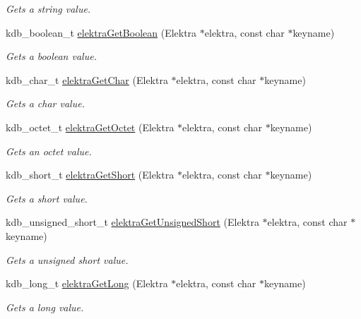 \begin{DoxyCompactItemize}
\begin{DoxyCompactList}\small\item\em Gets a string value. \end{DoxyCompactList}\item 
kdb\+\_\+boolean\+\_\+t \mbox{\hyperlink{group__highlevel_ga27fc805ae90d04aaacbdd754cb27687b}{elektra\+Get\+Boolean}} (Elektra $\ast$elektra, const char $\ast$keyname)
\begin{DoxyCompactList}\small\item\em Gets a boolean value. \end{DoxyCompactList}\item 
kdb\+\_\+char\+\_\+t \mbox{\hyperlink{group__highlevel_gab25c1deba0f9521206a9e1ec30a819d6}{elektra\+Get\+Char}} (Elektra $\ast$elektra, const char $\ast$keyname)
\begin{DoxyCompactList}\small\item\em Gets a char value. \end{DoxyCompactList}\item 
kdb\+\_\+octet\+\_\+t \mbox{\hyperlink{group__highlevel_ga69ae4ca538288d5e38f53a727f4ea7de}{elektra\+Get\+Octet}} (Elektra $\ast$elektra, const char $\ast$keyname)
\begin{DoxyCompactList}\small\item\em Gets an octet value. \end{DoxyCompactList}\item 
kdb\+\_\+short\+\_\+t \mbox{\hyperlink{group__highlevel_gab5dc2cac2b119cfc672bf28db8ec21df}{elektra\+Get\+Short}} (Elektra $\ast$elektra, const char $\ast$keyname)
\begin{DoxyCompactList}\small\item\em Gets a short value. \end{DoxyCompactList}\item 
kdb\+\_\+unsigned\+\_\+short\+\_\+t \mbox{\hyperlink{group__highlevel_ga373e1a04f8252f814be4b3ff5cb9812d}{elektra\+Get\+Unsigned\+Short}} (Elektra $\ast$elektra, const char $\ast$keyname)
\begin{DoxyCompactList}\small\item\em Gets a unsigned short value. \end{DoxyCompactList}\item 
kdb\+\_\+long\+\_\+t \mbox{\hyperlink{group__highlevel_gad4198ec223f01c3a6cfb1b78de34bc9e}{elektra\+Get\+Long}} (Elektra $\ast$elektra, const char $\ast$keyname)
\begin{DoxyCompactList}\small\item\em Gets a long value. \end{DoxyCompactList}\item 

\end{DoxyCompactItemize}
